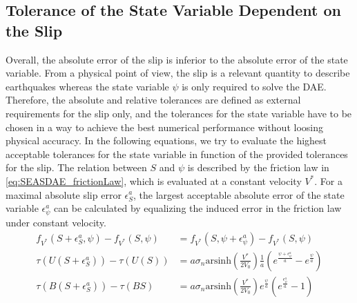\documentclass{report}
\begin{document}
\subsection{Tolerance of the State Variable Dependent on the Slip}
Overall, the absolute error of the slip is inferior to the absolute error of the state variable. From a physical point of view, the slip is a relevant quantity to describe earthquakes whereas the state variable $\psi$ is only required to solve the DAE. Therefore, the absolute and relative tolerances are defined as external requirements for the slip only, and the tolerances for the state variable have to be chosen in a way to achieve the best numerical performance without loosing physical accuracy. In the following equations, we try to evaluate the highest acceptable tolerances for the state variable in function of the provided tolerances for the slip. The relation between $S$ and $\psi$ is described by the friction law in \autoref{eq:SEASDAE_frictionLaw}, which is evaluated at a constant velocity $V^*$. For a maximal absolute slip error $\epsilon_S^a$, the largest acceptable absolute error of the state variable $\epsilon_\psi^a$ can be calculated by equalizing the induced error in the friction law under constant velocity. 
\begin{align}
    f_{V^*}(S+\epsilon_S^a,\psi) - f_{V^*}(S,\psi) &= f_{V^*}(S,\psi+\epsilon_\psi^a) - f_{V^*}(S,\psi) \\
    \tau(U(S+\epsilon_S^a)) - \tau(U(S)) &= a \sigma_n \text{arsinh}\left(\frac{V^*}{2V_0}\right)\frac{1}{a}\left(e^{\frac{\psi+\epsilon_\psi^a}{a}} - e^{\frac{\psi}{a}}\right) \\
    \tau(B(S+\epsilon_S^a)) - \tau(BS) &= a \sigma_n \text{arsinh}\left(\frac{V^*}{2V_0}\right) e^{\frac{\psi}{a}}\left(e^{\frac{\epsilon_\psi^a}{a}} - 1\right)
\end{align}
\end{document}
